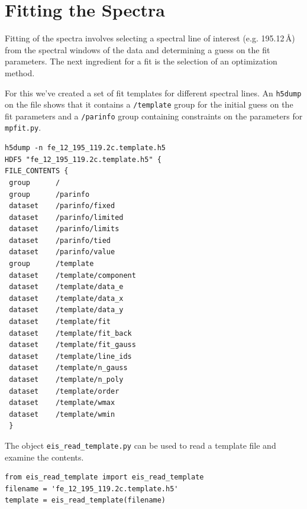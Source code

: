 
\chapter{Fitting the Spectra}

Fitting of the spectra involves selecting a spectral line of interest (e.g.  195.12\,\AA) from the spectral windows of the data and determining a guess on the fit parameters. The next ingredient for a fit is the selection of an optimization method.

For this we've created a set of fit templates for different spectral lines. An \verb+h5dump+ on the file shows that it contains a \verb+/template+ group for the initial guess on the fit parameters and a \verb+/parinfo+ group containing constraints on the parameters for \verb+mpfit.py+.

\begin{lstlisting}
h5dump -n fe_12_195_119.2c.template.h5
HDF5 "fe_12_195_119.2c.template.h5" {
FILE_CONTENTS {
 group      /
 group      /parinfo
 dataset    /parinfo/fixed
 dataset    /parinfo/limited
 dataset    /parinfo/limits
 dataset    /parinfo/tied
 dataset    /parinfo/value
 group      /template
 dataset    /template/component
 dataset    /template/data_e
 dataset    /template/data_x
 dataset    /template/data_y
 dataset    /template/fit
 dataset    /template/fit_back
 dataset    /template/fit_gauss
 dataset    /template/line_ids
 dataset    /template/n_gauss
 dataset    /template/n_poly
 dataset    /template/order
 dataset    /template/wmax
 dataset    /template/wmin
 }
\end{lstlisting}

 The object \verb+eis_read_template.py+ can be used to read a template file and examine the contents.

\begin{lstlisting}
from eis_read_template import eis_read_template
filename = 'fe_12_195_119.2c.template.h5'
template = eis_read_template(filename)
\end{lstlisting}

